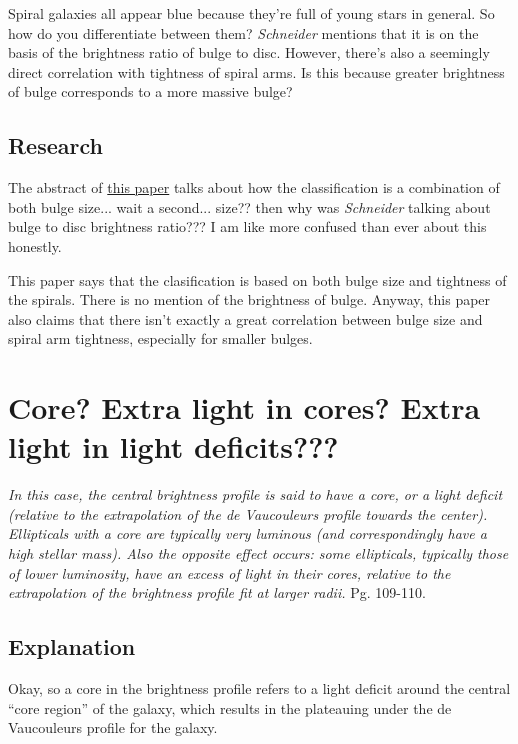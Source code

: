 \documentclass[a4paper,12pt]{article}
\newcommand{\ti}[1]{\textit{#1}}
\begin{document}
Spiral galaxies all appear blue because they're full of young stars in general. So how do you differentiate between them? \ti{Schneider} mentions that it is on the basis of the brightness ratio of bulge to disc. However, there's also a seemingly direct correlation with tightness of spiral arms. Is this because greater brightness of bulge corresponds to a more massive bulge?

\subsection*{Research}
The abstract of \href{https://arxiv.org/abs/1904.11436}{this paper} talks about how the classification is a combination of both bulge size... wait a second... size?? then why was \ti{Schneider} talking about bulge to disc brightness ratio??? I am like more confused than ever about this honestly.

\vspace{1em}

This paper says that the clasification is based on both bulge size and tightness of the spirals. There is no mention of the brightness of bulge. Anyway, this paper also claims that there isn't exactly a great correlation between bulge size and spiral arm tightness, especially for smaller bulges.


\section{Core? Extra light in cores? Extra light in light deficits???}

\ti{In this case, the central brightness profile is said to have a core, or a light deficit (relative to the extrapolation of the de Vaucouleurs profile towards the center). Ellipticals with a core are typically very luminous (and correspondingly have a high stellar mass). Also the opposite effect occurs: some ellipticals, typically those of lower luminosity, have an excess of light in their cores, relative to the extrapolation of the brightness profile fit at larger radii.} Pg. 109-110.

\subsection*{Explanation}
Okay, so a core in the brightness profile refers to a light deficit around the central ``core region'' of the galaxy, which results in the plateauing under the de Vaucouleurs profile for the galaxy.
\end{document}
